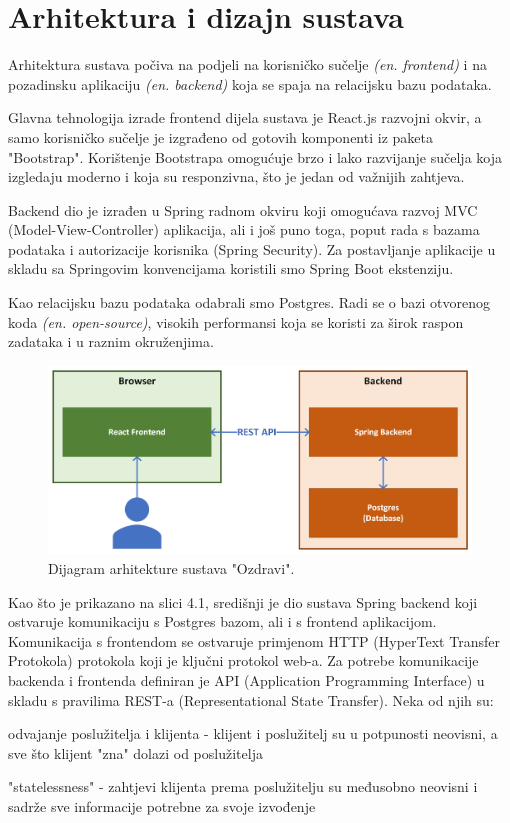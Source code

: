 \chapter{Arhitektura i dizajn sustava}
		Arhitektura sustava počiva na podjeli na korisničko sučelje \textit{(en. frontend)} i na pozadinsku aplikaciju \textit{(en. backend)} koja se spaja na relacijsku bazu podataka.

		Glavna tehnologija izrade frontend dijela sustava je React.js razvojni okvir, a samo korisničko sučelje je izgrađeno od gotovih komponenti iz paketa "Bootstrap". Korištenje Bootstrapa omogućuje brzo i lako razvijanje sučelja koja izgledaju moderno i koja su responzivna, 
		što je jedan od važnijih zahtjeva. 

		Backend dio je izrađen u Spring radnom okviru koji omogućava razvoj MVC (Model-View-Controller) aplikacija, ali i još puno toga, poput rada s bazama podataka i autorizacije korisnika (Spring Security). 
		Za postavljanje aplikacije u skladu sa Springovim konvencijama koristili smo Spring Boot ekstenziju.

		Kao relacijsku bazu podataka odabrali smo Postgres. Radi se o bazi otvorenog koda \textit{(en. open-source)}, visokih performansi koja se koristi za širok raspon zadataka i u raznim okruženjima.

		\begin{figure}[H]
			\includegraphics[width=\textwidth]{slike/architecture.png} 
			\caption{Dijagram arhitekture sustava "Ozdravi".}
		\end{figure}

		Kao što je prikazano na slici 4.1, središnji je dio sustava Spring backend koji ostvaruje komunikaciju s Postgres bazom, ali i s frontend aplikacijom. Komunikacija s frontendom se ostvaruje primjenom
		HTTP (HyperText Transfer Protokola) protokola koji je ključni protokol web-a. Za potrebe komunikacije backenda i frontenda definiran je API (Application Programming Interface) u skladu s pravilima REST-a (Representational State Transfer). Neka od njih su:
		\begin{packed_item}
			\item odvajanje poslužitelja i klijenta - klijent i poslužitelj su u potpunosti neovisni, a sve što klijent "zna" dolazi od poslužitelja
			\item "statelessness" - zahtjevi klijenta prema poslužitelju su međusobno neovisni i sadrže sve informacije potrebne za svoje izvođenje
		\end{packed_item}

